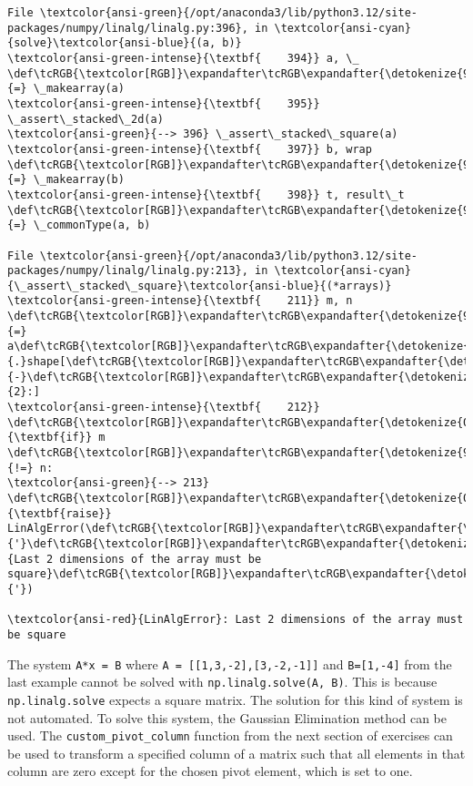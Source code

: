 \documentclass[11pt]{article}
\begin{document}
\begin{Verbatim}[commandchars=\\\{\}, frame=single, framerule=2mm, rulecolor=\color{outerrorbackground}]
File \textcolor{ansi-green}{/opt/anaconda3/lib/python3.12/site-packages/numpy/linalg/linalg.py:396}, in \textcolor{ansi-cyan}{solve}\textcolor{ansi-blue}{(a, b)}
\textcolor{ansi-green-intense}{\textbf{    394}} a, \_ \def\tcRGB{\textcolor[RGB]}\expandafter\tcRGB\expandafter{\detokenize{98,98,98}}{=} \_makearray(a)
\textcolor{ansi-green-intense}{\textbf{    395}} \_assert\_stacked\_2d(a)
\textcolor{ansi-green}{--> 396} \_assert\_stacked\_square(a)
\textcolor{ansi-green-intense}{\textbf{    397}} b, wrap \def\tcRGB{\textcolor[RGB]}\expandafter\tcRGB\expandafter{\detokenize{98,98,98}}{=} \_makearray(b)
\textcolor{ansi-green-intense}{\textbf{    398}} t, result\_t \def\tcRGB{\textcolor[RGB]}\expandafter\tcRGB\expandafter{\detokenize{98,98,98}}{=} \_commonType(a, b)

File \textcolor{ansi-green}{/opt/anaconda3/lib/python3.12/site-packages/numpy/linalg/linalg.py:213}, in \textcolor{ansi-cyan}{\_assert\_stacked\_square}\textcolor{ansi-blue}{(*arrays)}
\textcolor{ansi-green-intense}{\textbf{    211}} m, n \def\tcRGB{\textcolor[RGB]}\expandafter\tcRGB\expandafter{\detokenize{98,98,98}}{=} a\def\tcRGB{\textcolor[RGB]}\expandafter\tcRGB\expandafter{\detokenize{98,98,98}}{.}shape[\def\tcRGB{\textcolor[RGB]}\expandafter\tcRGB\expandafter{\detokenize{98,98,98}}{-}\def\tcRGB{\textcolor[RGB]}\expandafter\tcRGB\expandafter{\detokenize{98,98,98}}{2}:]
\textcolor{ansi-green-intense}{\textbf{    212}} \def\tcRGB{\textcolor[RGB]}\expandafter\tcRGB\expandafter{\detokenize{0,135,0}}{\textbf{if}} m \def\tcRGB{\textcolor[RGB]}\expandafter\tcRGB\expandafter{\detokenize{98,98,98}}{!=} n:
\textcolor{ansi-green}{--> 213}     \def\tcRGB{\textcolor[RGB]}\expandafter\tcRGB\expandafter{\detokenize{0,135,0}}{\textbf{raise}} LinAlgError(\def\tcRGB{\textcolor[RGB]}\expandafter\tcRGB\expandafter{\detokenize{175,0,0}}{'}\def\tcRGB{\textcolor[RGB]}\expandafter\tcRGB\expandafter{\detokenize{175,0,0}}{Last 2 dimensions of the array must be square}\def\tcRGB{\textcolor[RGB]}\expandafter\tcRGB\expandafter{\detokenize{175,0,0}}{'})

\textcolor{ansi-red}{LinAlgError}: Last 2 dimensions of the array must be square
    \end{Verbatim}

    The system \texttt{A*x\ =\ B} where
\texttt{A\ =\ {[}{[}1,3,-2{]},{[}3,-2,-1{]}{]}} and
\texttt{B={[}1,-4{]}} from the last example cannot be solved with
\texttt{np.linalg.solve(A,\ B)}. This is because
\texttt{np.linalg.solve} expects a square matrix. The solution for this
kind of system is not automated. To solve this system, the Gaussian
Elimination method can be used. The \texttt{custom\_pivot\_column}
function from the next section of exercises can be used to transform a
specified column of a matrix such that all elements in that column are
zero except for the chosen pivot element, which is set to one.
\end{document}
